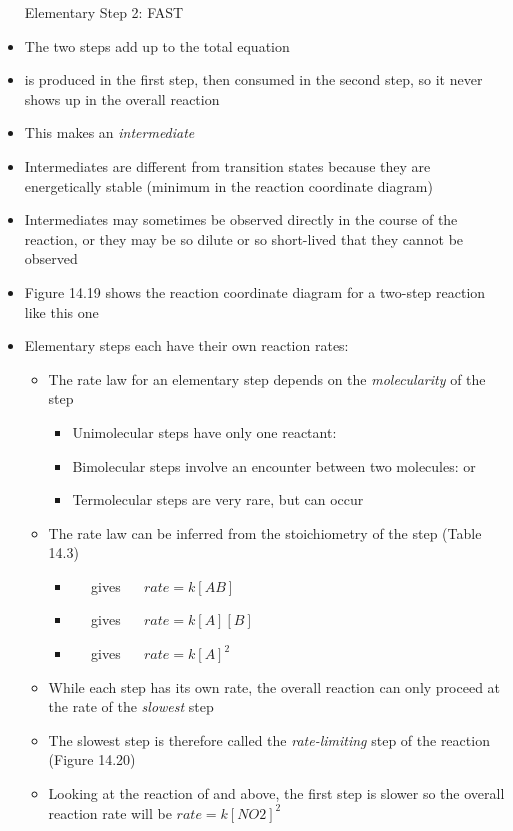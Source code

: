 \documentclass[12pt, openany, letterpaper]{memoir}
\begin{document}
\begin{itemize}
	Elementary Step 2:  \hspace{1em} FAST
	\item The two steps add up to the total equation
	\item {} is produced in the first step, then consumed in the second step, so it never shows up in the overall reaction
	\item This makes  an \emph{intermediate}
	\item Intermediates are different from transition states because they are energetically stable (minimum in the reaction coordinate diagram)
	\item Intermediates may sometimes be observed directly in the course of the reaction, or they may be so dilute or so short-lived that they cannot be observed
	\item Figure 14.19 shows the reaction coordinate diagram for a two-step reaction like this one
	\item Elementary steps each have their own reaction rates:
	\begin{itemize}
		\item The rate law for an elementary step depends on the \emph{molecularity} of the step
		\begin{itemize}
			\item Unimolecular steps have only one reactant: 
			\item Bimolecular steps involve an encounter between two molecules:  or 
			\item Termolecular steps are very rare, but can occur
		\end{itemize}
		\item The rate law can be inferred from the stoichiometry of the step (Table 14.3)
		\begin{itemize}
			\item {} ~~ gives ~~ $rate=k\left[AB\right]$
			\item {} ~~ gives ~~ $rate=k\left[A\right]\left[B\right]$
			\item {} ~~ gives ~~ $rate=k\left[A\right]^2$
		\end{itemize}
		\item While each step has its own rate, the overall reaction can only proceed at the rate of the \emph{slowest} step
		\item The slowest step is therefore called the \emph{rate-limiting} step of the reaction (Figure 14.20)
		\item Looking at the reaction of  and  above, the first step is slower so the overall reaction rate will be $rate=k\left[NO2\right]^2$

\end{itemize}
\end{itemize}
\end{document}
